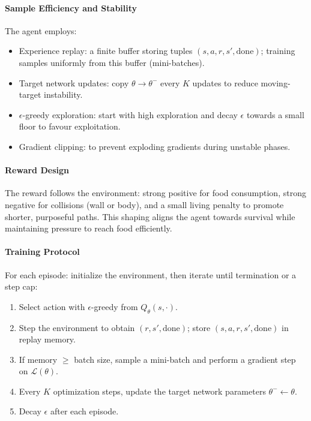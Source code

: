 \documentclass[a4paper,12pt]{article}
\begin{document}
\paragraph{Sample Efficiency and Stability} The agent employs:
\begin{itemize}
   \item Experience replay: a finite buffer storing tuples $(s,a,r,s',\text{done})$; training samples uniformly from this buffer (mini-batches).
   \item Target network updates: copy $\theta\to\theta^-$ every $K$ updates to reduce moving-target instability.
   \item $\epsilon$-greedy exploration: start with high exploration and decay $\epsilon$ towards a small floor to favour exploitation.
   \item Gradient clipping: to prevent exploding gradients during unstable phases.
\end{itemize}

\paragraph{Reward Design} The reward follows the environment: strong positive for food consumption, strong negative for collisions (wall or body), and a small living penalty to promote shorter, purposeful paths. This shaping aligns the agent towards survival while maintaining pressure to reach food efficiently.

\paragraph{Training Protocol} For each episode: initialize the environment, then iterate until termination or a step cap:
\begin{enumerate}
   \item Select action with $\epsilon$-greedy from $Q_\theta(s,\cdot)$.
   \item Step the environment to obtain $(r,s',\text{done})$; store $(s,a,r,s',\text{done})$ in replay memory.
   \item If memory $\ge$ batch size, sample a mini-batch and perform a gradient step on $\mathcal{L}(\theta)$.
   \item Every $K$ optimization steps, update the target network parameters $\theta^-\leftarrow\theta$.
   \item Decay $\epsilon$ after each episode.
\end{enumerate}
\end{document}
